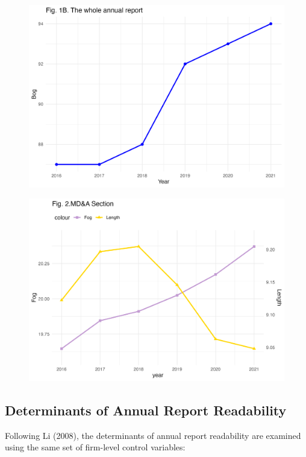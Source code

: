 \documentclass[a4paper]{article}
\begin{document}
\begin{figure}[htbp]
    \centering
    \includegraphics[width=\linewidth]{Images/fig1b.png}
\end{figure}

\begin{figure}[htbp]
    \centering
    \includegraphics[width=\linewidth]{Images/fig2.png}
\end{figure}

\subsection{Determinants of Annual Report Readability}

Following Li (2008), the determinants of annual report readability are examined using the same set of firm-level control variables:
\end{document}
